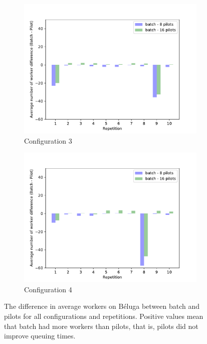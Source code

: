 \begin{figure}
	    \begin{subfigure}[b]{0.475\textwidth}
		\centering
		\includegraphics[width=\textwidth]{figures/part2-chp2/nworkers_3_beluga}
		\caption[]%
		{{\small Configuration 3}}
		\label{fig:nwbeluga3}
	    \end{subfigure}
	    \quad
	    \begin{subfigure}[b]{0.475\textwidth}
		\centering
		\includegraphics[width=\textwidth]{figures/part2-chp2/nworkers_4_beluga}
		\caption[]%
		{{\small Configuration 4}}
		\label{fig:nwbeluga4}
	    \end{subfigure}
	    \caption{\small  The difference in average workers on B\'eluga between batch and pilots for all configurations and repetitions. Positive values mean
	    that batch had more workers than pilots, that is, pilots did not improve queuing times.}
	    \label{fig:nworkersbeluga}
	\end{figure}
